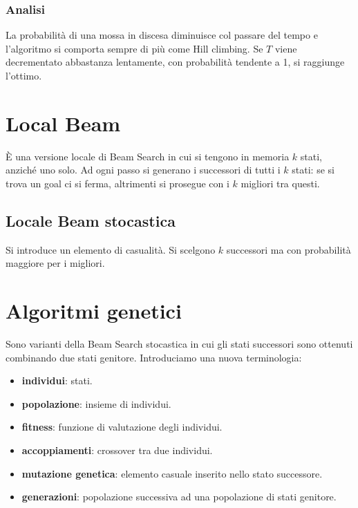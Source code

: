 \subsubsection{Analisi}
La probabilit\`a di una mossa in discesa diminuisce col passare del tempo e l'algoritmo si comporta sempre di pi\`u come Hill climbing.
Se $T$ viene decrementato abbastanza lentamente, con probabilit\`a tendente a 1, si raggiunge l'ottimo.

\section{Local Beam}
\`E una versione locale di Beam Search in cui si tengono in memoria $k$ stati, anzich\'e uno solo. Ad ogni passo si generano i successori
di tutti i $k$ stati: se si trova un goal ci si ferma, altrimenti si prosegue con i $k$ migliori tra questi.

\subsection{Locale Beam stocastica}
Si introduce un elemento di casualit\`a. Si scelgono $k$ successori ma con probabilit\`a maggiore per i migliori.

\section{Algoritmi genetici}
Sono varianti della Beam Search stocastica in cui gli stati successori sono ottenuti combinando due stati genitore.
Introduciamo una nuova terminologia:
\begin{itemize}
	\item \textbf{individui}: stati.
	\item \textbf{popolazione}: insieme di individui.
	\item \textbf{fitness}: funzione di valutazione degli individui.
	\item \textbf{accoppiamenti}: crossover tra due individui.
	\item \textbf{mutazione genetica}: elemento casuale inserito nello stato successore.
	\item \textbf{generazioni}: popolazione successiva ad una popolazione di stati genitore.
\end{itemize}

